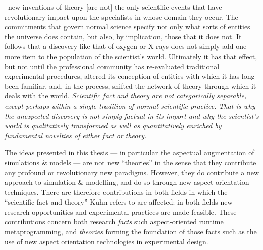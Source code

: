 \begin{displayquote}
   \textelp{}~new inventions of theory [are not] the only scientific events that
   have revolutionary impact upon the specialists in whose domain they occur.
   The commitments that govern normal science specify not only what sorts of
   entities the universe does contain, but also, by implication, those that it
   does not. It follows \textelp{} that a discovery like that of oxygen or
   X-rays does not simply add one more item to the population of the scientist's
   world. Ultimately it has that effect, but not until the professional
   community has re-evaluated traditional experimental procedures, altered its
   conception of entities with which it has long been familiar, and, in the
   process, shifted the network of theory through which it deals with the world.
   \emph{Scientific fact and theory are not categorically separable, except perhaps
   within a single tradition of normal-scientific practice. That is why the
   unexpected discovery is not simply factual in its import and why the
   scientist's world is qualitatively transformed as well as quantitatively
   enriched by fundamental novelties of either fact or theory.}
\end{displayquote}

The ideas presented in this thesis --- in particular the aspectual augmentation
of simulations \& models --- are not new ``theories'' in the sense that they
contribute any profound or revolutionary new paradigms. However, they do
contribute a new approach to simulation \& modelling, and do so through new
aspect orientation techniques. There are therefore contributions in both fields
in which the ``scientific fact and theory'' Kuhn refers to are affected: in both
fields new research opportunities and experimental practices are made feasible.
These contributions concern both research \emph{facts} such aspect-oriented
runtime metaprogramming, and \emph{theories} forming the foundation of those
facts such as the use of new aspect orientation technologies in experimental
design.

